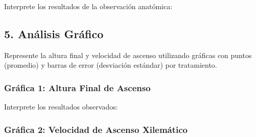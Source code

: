 \documentclass[
  spanish,
  10pt,
  letterpaper,
  twocolumn]{article}
\begin{document}
Interprete los resultados de la observación anatómica:

\hrulefill

\hrulefill

\hrulefill

\hrulefill

\subsection{5. Análisis Gráfico}\label{anuxe1lisis-gruxe1fico}

Represente la altura final y velocidad de ascenso utilizando gráficas
con puntos (promedio) y barras de error (desviación estándar) por
tratamiento.

\subsubsection{Gráfica 1: Altura Final de
Ascenso}\label{gruxe1fica-1-altura-final-de-ascenso}

\begin{center}
\end{center}

Interprete los resultados observados:

\hrulefill

\hrulefill

\hrulefill

\hrulefill

\hrulefill

\subsubsection{Gráfica 2: Velocidad de Ascenso
Xilemático}\label{gruxe1fica-2-velocidad-de-ascenso-xilemuxe1tico}
\end{document}
